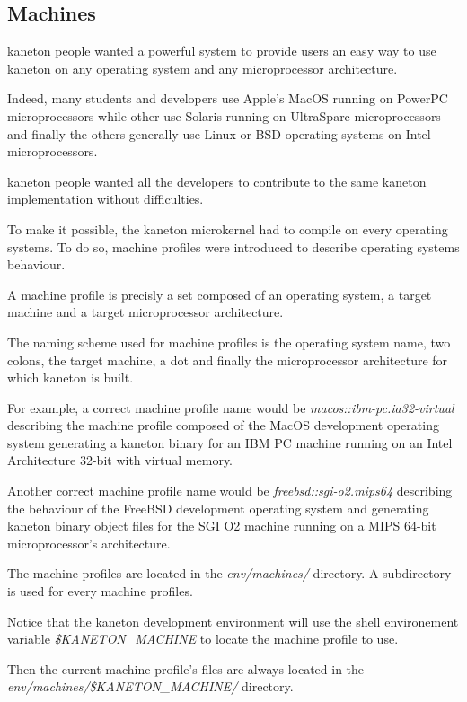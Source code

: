 %
%

\subsection{Machines}

kaneton people wanted a powerful system to provide users an easy way
to use kaneton on any operating system and any microprocessor architecture.

Indeed, many students and developers use Apple's MacOS running on PowerPC
microprocessors while other use Solaris running on UltraSparc microprocessors
and finally the others generally use Linux or BSD operating systems on
Intel microprocessors.

kaneton people wanted all the developers to contribute to the same
kaneton implementation without difficulties.

To make it possible, the kaneton microkernel had to compile on
every operating systems. To do so, machine profiles were introduced to
describe operating systems behaviour.

A machine profile is precisly a set composed of an operating system,
a target machine and a target microprocessor architecture.

The naming scheme used for machine profiles is the operating system name,
two colons, the target machine, a dot and finally the microprocessor
architecture for which kaneton is built.

For example, a correct machine profile name would be
\textit{macos::ibm-pc.ia32-virtual} describing the machine profile composed
of the MacOS development operating system generating a kaneton binary for
an IBM PC machine running on an Intel Architecture 32-bit with virtual memory.

Another correct machine profile name would be \textit{freebsd::sgi-o2.mips64}
describing the behaviour of the FreeBSD development operating system and
generating kaneton binary object files for the SGI O2 machine running on
a MIPS 64-bit microprocessor's architecture.

The machine profiles are located in the \textit{env/machines/} directory.
A subdirectory is used for every machine profiles.

Notice that the kaneton development environment will use the shell
environement variable \textit{\$KANETON\_MACHINE} to locate the
machine profile to use.

Then the current machine profile's files are always located in the
\textit{env/machines/\$KANETON\_MACHINE/} directory.

